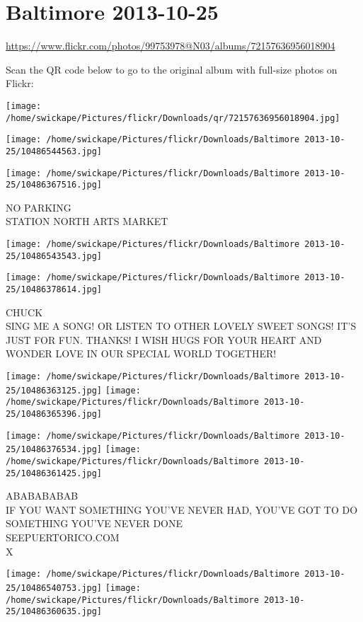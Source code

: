 \documentclass[10pt,letterpaper]{article}
\title{}
\author{}
\date{}
\begin{document}
\section*{Baltimore 2013-10-25}

\url{https://www.flickr.com/photos/99753978@N03/albums/72157636956018904}

Scan the QR code below to go to the original album with full-size photos on Flickr:

\texttt{[image: /home/swickape/Pictures/flickr/Downloads/qr/72157636956018904.jpg]}
\pagebreak

\texttt{[image: /home/swickape/Pictures/flickr/Downloads/Baltimore 2013-10-25/10486544563.jpg]}

\vspace{0.25in}
\texttt{[image: /home/swickape/Pictures/flickr/Downloads/Baltimore 2013-10-25/10486367516.jpg]}

NO PARKING\\
STATION NORTH ARTS MARKET
\pagebreak

\texttt{[image: /home/swickape/Pictures/flickr/Downloads/Baltimore 2013-10-25/10486543543.jpg]}

\vspace{0.25in}
\texttt{[image: /home/swickape/Pictures/flickr/Downloads/Baltimore 2013-10-25/10486378614.jpg]}

CHUCK\\
SING ME A SONG!  OR LISTEN TO OTHER LOVELY SWEET SONGS! IT'S JUST FOR FUN. THANKS! I WISH HUGS FOR YOUR HEART AND WONDER LOVE IN OUR SPECIAL WORLD TOGETHER!
\pagebreak

\texttt{[image: /home/swickape/Pictures/flickr/Downloads/Baltimore 2013-10-25/10486363125.jpg]}
\texttt{[image: /home/swickape/Pictures/flickr/Downloads/Baltimore 2013-10-25/10486365396.jpg]}

\texttt{[image: /home/swickape/Pictures/flickr/Downloads/Baltimore 2013-10-25/10486376534.jpg]}
\texttt{[image: /home/swickape/Pictures/flickr/Downloads/Baltimore 2013-10-25/10486361425.jpg]}

ABABABABAB\\
IF YOU WANT SOMETHING YOU'VE NEVER HAD, YOU'VE GOT TO DO SOMETHING YOU'VE NEVER DONE\\
SEEPUERTORICO.COM\\
X
\pagebreak

\texttt{[image: /home/swickape/Pictures/flickr/Downloads/Baltimore 2013-10-25/10486540753.jpg]}
\texttt{[image: /home/swickape/Pictures/flickr/Downloads/Baltimore 2013-10-25/10486360635.jpg]}
\end{document}
